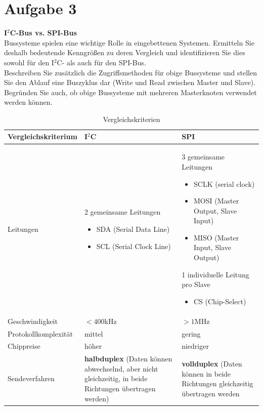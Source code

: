\documentclass[12pt,a4paper,ngerman]{article}
\begin{document}
\pagebreak

\section*{Aufgabe 3}


\begin{framed}
\textbf{I$^2$C-Bus vs. SPI-Bus}\\
Bussysteme spielen eine wichtige Rolle in eingebettenen Systemen. Ermitteln Sie deshalb bedeutende Kenngrößen zu deren Vergleich und identifizieren Sie dies sowohl für den I$^2$C- als auch für den SPI-Bus. \\
Beschreiben Sie zusätzlich die Zugriffsmethoden für obige Bussysteme und stellen Sie den Ablauf eine Buszyklus dar (Write und Read zwischen Master und Slave). Begründen Sie auch, ob obige Bussysteme mit mehreren Masterknoten verwendet werden können.
\end{framed}
\begin{table}[h!]
  \begin{center}
    \begin{tabular}{| l | p{6cm} | p{6cm} |}
    \hline
     Vergleichskriterium & I$^2$C & SPI  \\ \hline \hline
    Leitungen & 2 gemeinsame Leitungen \begin{itemize}
    \item SDA (Serial Data Line)
    \item SCL (Serial Clock Line) 
\end{itemize}     & 	3 gemeinsame Leitungen \begin{itemize}
    \item SCLK (serial clock) 
    \item MOSI (Master Output, Slave Input)
    \item MISO (Master Input, Slave Output)
    \end{itemize}
    1 individuelle Leitung pro Slave
    \begin{itemize}
    \item CS (Chip-Select)
    \end{itemize}
       \\ \hline
       Geschwindigkeit & $<400$kHz & $>1$MHz \\ \hline
       Protokollkomplexität & mittel & gering \\ \hline
       Chippreise & höher & niedriger \\ \hline
       Sendeverfahren & \textbf{halbduplex} (Daten können abwechselnd, aber nicht gleichzeitig, in beide Richtungen übertragen werden) & \textbf{vollduplex} (Daten können in beide Richtungen gleichzeitig übertragen werden \\ \hline
    \end{tabular}
  \end{center}
  \caption{Vergleichskriterien}
\end{table}
\end{document}
